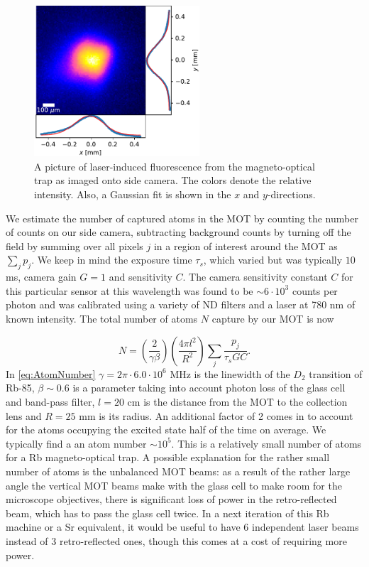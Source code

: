 \begin{figure}
    \centering
    \includegraphics[width=0.55\textwidth]{figures/FluoresenceAndFits.pdf}
    \caption{A picture of laser-induced fluorescence from the magneto-optical trap as imaged onto side camera. 
    The colors denote the relative intensity.
    Also, a Gaussian fit is shown in the $x$ and $y$-directions.}
    \label{fig:LiF}
\end{figure}

   
We estimate the number of captured atoms in the MOT by counting the number of counts on our side camera, subtracting background counts by turning off the field by summing over all pixels $j$ in a region of interest around the MOT as $\sum_j p_j$.
We keep in mind the exposure time $\tau_s$, which varied but was typically $10$ ms, camera gain $G = 1$ and sensitivity $C$.
The camera sensitivity constant $C$ for this particular sensor at this wavelength was found to be $\sim 6 \cdot 10^3$ counts per photon and was calibrated using a variety of ND filters and a laser at 780 nm of known intensity. The total number of atoms $N$ capture by our MOT is now
 
 \begin{equation}\label{eq:AtomNumber}
     N = \left( \frac{2}{\gamma\beta}\right)
     \left(\frac{4\pi l^2}{R^2}\right)
     \sum_j \frac{p_j}{\tau_s G C}.
 \end{equation}
In \cref{eq:AtomNumber} $\gamma = 2\pi \cdot 6.0 \cdot 10^6$ MHz is the linewidth of the $D_2$ transition of Rb-85, $\beta \sim 0.6$ is a parameter taking into account photon loss of the glass cell and band-pass filter, $l = 20$ cm is the distance from the MOT to the collection lens and $R = 25$ mm is its radius. 
An additional factor of 2 comes in to account for the atoms occupying the excited state half of the time on average. 
We typically find a an atom number $\sim 10^5$.
This is a relatively small number of atoms for a Rb magneto-optical trap.
A possible explanation for the rather small number of atoms is the unbalanced MOT beams: as a result of the rather large angle the vertical MOT beams make with the glass cell to make room for the microscope objectives, there is significant loss of power in the retro-reflected beam, which has to pass the glass cell twice. 
In a next iteration of this Rb machine or a Sr equivalent, it would be useful to have 6 independent laser beams instead of 3 retro-reflected ones, though this comes at a cost of requiring more power. 
 
